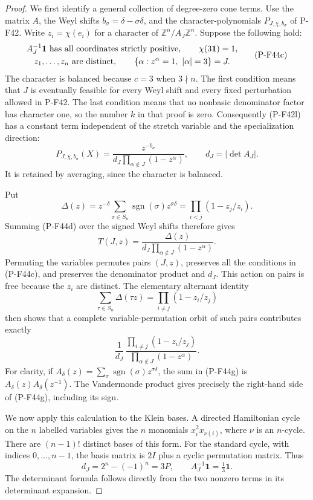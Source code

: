 \documentclass[11pt,a4paper]{article}
\begin{document}
\begin{proof}
We first identify a general collection of degree-zero cone terms.
Use the matrix $A$, the Weyl shifts $b_\sigma=\delta-\sigma\delta$,
and the character-polynomials $P_{J,\chi,b_\sigma}$ of P-F42.
Write $z_i=\chi(e_i)$ for a character of
$\mathbb Z^n/A_J\mathbb Z^n$.
Suppose the following hold:
\[
 \begin{gathered}
 A_J^{-1}\mathbf1\ \hbox{has all coordinates strictly positive},
 \qquad \chi(3\mathbf1)=1,\\
 z_1,\ldots,z_n\ \hbox{are distinct},\qquad
 \{\alpha:z^\alpha=1,\ |\alpha|=3\}=J.
 \end{gathered}
 \tag{P-F44c}
\]
The character is balanced because $c=3$ when $3\nmid n$.
The first condition means that $J$ is eventually feasible
for every Weyl shift and every fixed perturbation allowed
in P-F42. The last condition means that no nonbasic
denominator factor has character one, so the number $k$
in that proof is zero.
Consequently (P-F42l) has a constant term independent of
the stretch variable and the specialization direction:
\[
 P_{J,\chi,b_\sigma}(X)=
 \frac{z^{-b_\sigma}}
 {d_J\prod_{\alpha\notin J}(1-z^\alpha)},\qquad
 d_J=|\det A_J|.
 \tag{P-F44d}
\]
It is retained by averaging, since the character is balanced.

Put
\[
 \Delta(z)=z^{-\delta}
                  \sum_{\sigma\in S_n}
                         \operatorname{sgn}(\sigma)z^{\sigma\delta}
          =\prod_{i<j}(1-z_j/z_i).
 \tag{P-F44e}
\]
Summing (P-F44d) over the signed Weyl shifts therefore gives
\[
 T(J,z)=
 \frac{\Delta(z)}
 {d_J\prod_{\alpha\notin J}(1-z^\alpha)}.
 \tag{P-F44f}
\]
Permuting the variables permutes pairs $(J,z)$, preserves
all the conditions in (P-F44c), and preserves the denominator
product and $d_J$. This action on pairs is free because the
$z_i$ are distinct.
The elementary alternant identity
\[
 \sum_{\tau\in S_n}\Delta(\tau z)
       =\prod_{i\ne j}(1-z_i/z_j)
 \tag{P-F44g}
\]
then shows that a complete variable-permutation orbit of
such pairs contributes exactly
\[
 \frac1{d_J}\,
 \frac{\prod_{i\ne j}(1-z_i/z_j)}
      {\prod_{\alpha\notin J}(1-z^\alpha)}.
 \tag{P-F44h}
\]
For clarity, if
$A_\delta(z)=\sum_\sigma\operatorname{sgn}(\sigma)
z^{\sigma\delta}$, the sum in (P-F44g) is
$A_\delta(z)A_\delta(z^{-1})$.
The Vandermonde product gives precisely the right-hand
side of (P-F44g), including its sign.

We now apply this calculation to the Klein bases.
A directed Hamiltonian cycle on the $n$ labelled variables
gives the $n$ monomials $x_i^2x_{\nu(i)}$, where $\nu$ is
an $n$-cycle. There are $(n-1)!$ distinct bases of this
form. For the standard cycle, with indices $0,\ldots,n-1$,
the basis matrix is $2I$ plus a cyclic permutation matrix.
Thus
\[
 d_J=2^n-(-1)^n=3P,\qquad
                  A_J^{-1}\mathbf1=\tfrac13\mathbf1.
 \tag{P-F44i}
\]
The determinant formula follows directly from the two
nonzero terms in its determinant expansion.


\end{proof}
\end{document}
